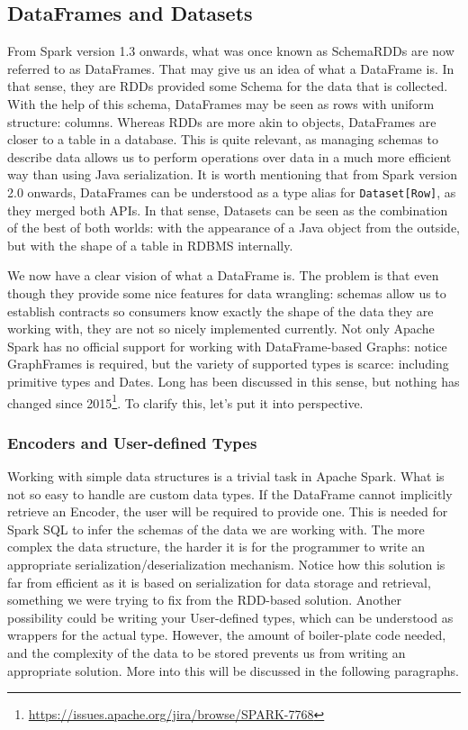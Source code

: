 \subsection{DataFrames and Datasets}

From Spark version 1.3 onwards, what was once known as SchemaRDDs are now referred to as DataFrames. That may give us an idea of what a DataFrame is. In that sense, they are RDDs provided some Schema for the data that is collected. With the help of this schema, DataFrames may be seen as rows with uniform structure: columns. Whereas RDDs are more akin to objects, DataFrames are closer to a table in a database. This is quite relevant, as managing schemas to describe data allows us to perform operations over data in a much more efficient way than using Java serialization. It is worth mentioning that from Spark version 2.0 onwards, DataFrames can be understood as a type alias for \texttt{Dataset[Row]}, as they merged both APIs. In that sense, Datasets can be seen as the combination of the best of both worlds: with the appearance of a Java object from the outside, but with the shape of a table in RDBMS internally.

We now have a clear vision of what a DataFrame is. The problem is that even though they provide some nice features for data wrangling: schemas allow us to establish contracts so consumers know exactly the shape of the data they are working with, they are not so nicely implemented currently. Not only Apache Spark has no official support for working with DataFrame-based Graphs: notice GraphFrames is required, but the variety of supported types is scarce: including primitive types and Dates. Long has been discussed in this sense, but nothing has changed since 2015\footnote{\url{https://issues.apache.org/jira/browse/SPARK-7768}}. To clarify this, let's put it into perspective.

\subsubsection{Encoders and User-defined Types}

Working with simple data structures is a trivial task in Apache Spark. What is not so easy to handle are custom data types. If the DataFrame cannot implicitly retrieve an Encoder, the user will be required to provide one. This is needed for Spark SQL to infer the schemas of the data we are working with. The more complex the data structure, the harder it is for the programmer to write an appropriate serialization/deserialization mechanism. Notice how this solution is far from efficient as it is based on serialization for data storage and retrieval, something we were trying to fix from the RDD-based solution. Another possibility could be writing your  User-defined types, which can be understood as wrappers for the actual type. However, the amount of boiler-plate code needed, and the complexity of the data to be stored prevents us from writing an appropriate solution. More into this will be discussed in the following paragraphs.


